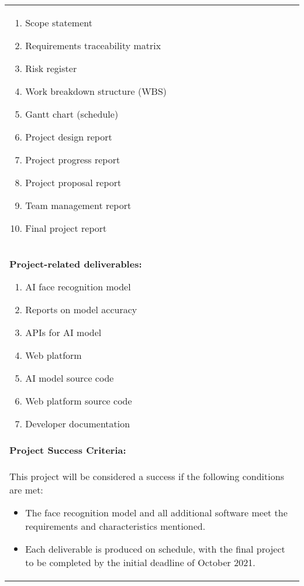 \begin{longtable}{ | p{} l | }
{\begin{enumerate}
            \item Scope statement
            \item Requirements traceability matrix
            \item Risk register
            \item Work breakdown structure (WBS)
            \item Gantt chart (schedule)
            \item Project design report
            \item Project progress report
            \item Project proposal report
            \item Team management report
            \item Final project report
        \end{enumerate}
    } \\
    \multicolumn{2}{|p{\textwidth}|}{\textbf{Project-related deliverables:}
        \begin{enumerate}
            \item AI face recognition model
            \item Reports on model accuracy
            \item APIs for AI model
            \item Web platform
            \item AI model source code
            \item Web platform source code
            \item Developer documentation
        \end{enumerate}
    } \\
    \hline
    \multicolumn{2}{|l|}{\textbf{Project Success Criteria:}} \\
    \multicolumn{2}{|p{\textwidth}|}{This project will be considered a success if the following conditions are met:
        \begin{itemize}
            \item The face recognition model and all additional software meet the requirements and characteristics mentioned.
            \item Each deliverable is produced on schedule, with the final project to be completed by the initial deadline of October 2021.
        \end{itemize}
    } \\
    \hline
\end{longtable}
